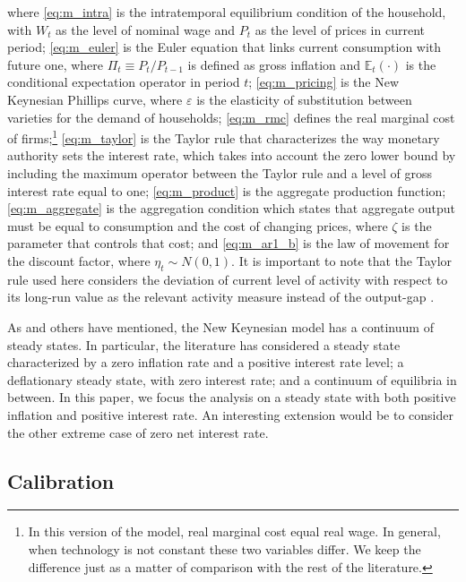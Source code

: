\documentclass[11pt]{article}
\numberwithin{equation}{section}
\begin{document}
\noindent where \eqref{eq:m_intra} is the intratemporal equilibrium condition of the household, with $W_t$ as the level of nominal wage and $P_t$ as the level of prices in current period; \eqref{eq:m_euler} is the Euler equation that links current consumption with future one, where $\Pi_t\equiv P_t/P_{t-1}$ is defined as gross inflation and $\mathbb{E}_t(\cdot)$ is the conditional expectation operator in period $t$; \eqref{eq:m_pricing} is the New Keynesian Phillips curve, where $\varepsilon$ is the elasticity of substitution between varieties for the demand of households; \eqref{eq:m_rmc} defines the real marginal cost of firms;\footnote{In this version of the model, real marginal cost equal real wage. In general, when technology is not constant these two variables differ. We keep the difference just as a matter of comparison with the rest of the literature.} \eqref{eq:m_taylor} is the Taylor rule that characterizes the way monetary authority sets the interest rate, which takes into account the zero lower bound by including the maximum operator between the Taylor rule and a level of gross interest rate equal to one; \eqref{eq:m_product} is the aggregate production function; \eqref{eq:m_aggregate} is the aggregation condition which states that aggregate output must be equal to consumption and the cost of changing prices, where $\zeta$ is the parameter that controls that cost; and \eqref{eq:m_ar1_b} is the law of movement for the discount factor, where $\eta_t\sim N(0,1)$. It is important to note that the Taylor rule used here considers the deviation of current level of activity with respect to its long-run value as the relevant activity measure instead of the output-gap \citep{Gali2015}.

As \cite{BenhabibEtAl2001a} and others have mentioned, the New Keynesian model has a continuum of steady states. In particular, the literature has considered a steady state characterized by a zero inflation rate and a positive interest rate level; a deflationary steady state, with zero interest rate; and a continuum of equilibria in between. In this paper, we focus the analysis on a steady state with both positive inflation and positive interest rate. An interesting extension would be to consider the other extreme case of zero net interest rate.

\subsection{Calibration}
\end{document}
